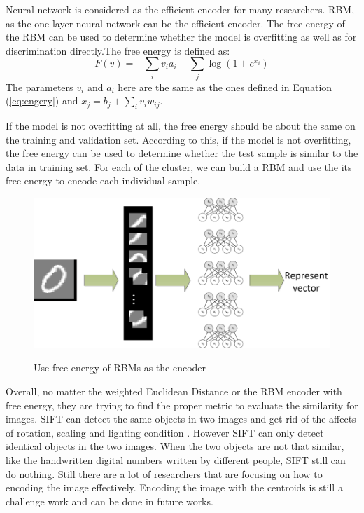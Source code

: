 Neural network is considered as the efficient encoder for many researchers\cite{rehn2007network}\cite{Srivastava13}\cite{Hinton12}. RBM, as the one layer neural network can be the efficient encoder. The free energy of the RBM can be used to determine whether the model is overfitting as well as for discrimination directly.The free energy is defined as:
\begin{equation}\label{eq:fe}
  F(v) =  - \sum\limits_i {{v_i}{a_i}}  - \sum\limits_j {\log (1 + {e^{{x_i}}})}
\end{equation}
 The parameters $v_i$ and $a_i$ here are the same as the ones defined in Equation (\ref{eq:engery}) and ${x_j} = {b_j} + \sum\limits_i {{v_i}{w_{ij}}}$.

 If the model is not overfitting at all, the free energy should be about the same on the training and validation set\cite{Hinton12}. According to this, if the model is not overfitting, the free energy can be used to determine whether the test sample is similar to the data in training set. For each of the cluster, we can build a RBM and use the its free energy to encode each individual sample.
\begin{figure}
  \centering
  \includegraphics[scale = .5]{fig/RBM_encoder.png}\\
  \caption{Use free energy of RBMs as the encoder}
\end{figure}

 Overall, no matter the weighted Euclidean Distance or the RBM encoder with free energy, they are trying to find the proper metric to evaluate the similarity for images. SIFT can detect the same objects in two images and get rid of the affects of rotation, scaling and lighting condition \cite{lowe1999object}. However SIFT can only detect identical objects in the two images. When the two objects are not that similar, like the handwritten digital numbers written by different people, SIFT still can do nothing. Still there are a lot of researchers that are focusing on how to encoding the image effectively. Encoding the image with the centroids is still a challenge work and can be done in future works. 